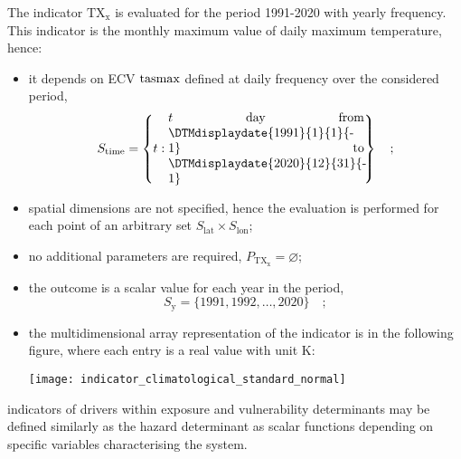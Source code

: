 \begin{example}
  The \gls{indicator} $\mathrm{TX_x}$ is evaluated for the period 1991-2020 with yearly frequency. This \gls{indicator} is the monthly maximum value of daily maximum temperature,\cite{ETCCDIClimate} hence:
  \begin{itemize}
    \item it depends on \gls{ECV} $\mathrm{tasmax}$ defined at daily frequency over the considered period,
      \begin{equation*}
        S_\text{time} = \left\{ t : \parbox{0.45\linewidth}{$t$ day from \DTMdisplaydate{1991}{1}{1}{-1} to \DTMdisplaydate{2020}{12}{31}{-1}} \right\}
        \quad ;
      \end{equation*}
    \item spatial dimensions are not specified, hence the evaluation is performed for each point of an arbitrary set $S_\text{lat} \times S_\text{lon}$;
    \item no additional parameters are required, $P_\mathrm{TX_x} = \varnothing$;
    \item the outcome is a scalar value for each year in the period,
      \begin{equation*}
        S_\text{y} = \{ 1991, 1992, \dots, 2020 \}
        \quad ;
      \end{equation*}
    \item the multidimensional array representation of the \gls{indicator} is in the following figure, where each entry is a real value with unit \unit{\kelvin}:
      \begin{center}
        \texttt{[image: indicator\_climatological\_standard\_normal]}
      \end{center}
  \end{itemize}
\end{example}

\Glspl{indicator} of \glspl{driver} within \gls{exposure} and \gls{vulnerability} \glspl{determinant} may be defined similarly as the \gls{hazard} \gls{determinant} as scalar functions depending on specific variables characterising the system.
